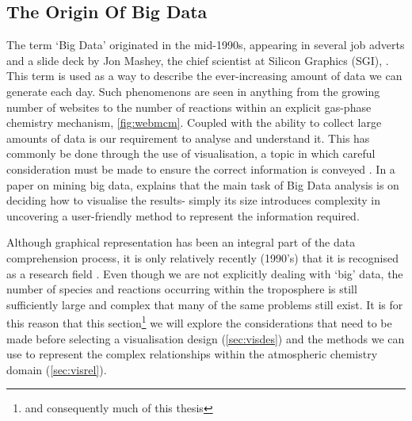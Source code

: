 %
%
%
%


\subsection{The Origin Of Big Data}
The term `Big Data' originated in the mid-1990s, appearing in several job adverts and a slide deck by Jon Mashey, the chief scientist at Silicon Graphics (SGI), \citep{slidedeck,bigdataorigin}. This term is used as a way to describe the ever-increasing amount of data we can generate each day. Such phenomenons are seen in anything from the growing number of websites to the number of reactions within an explicit gas-phase chemistry mechanism, \autoref{fig:webmcm}. Coupled with the ability to collect large amounts of data is our requirement to analyse and understand it. This has commonly be done through the use of visualisation, a topic in which careful consideration must be made to ensure the correct information is conveyed \citep{kirk}. In a paper on mining big data, \citep{bigdatamine} explains that the main task of Big Data analysis is on deciding how to visualise the results- simply its size introduces complexity in uncovering a user-friendly method to represent the information required.

Although graphical representation has been an integral part of the data comprehension process, it is only relatively recently (1990's) that it is recognised as a research field \citep{ch6}. Even though we are not explicitly dealing with `big' data, the number of species and reactions occurring within the troposphere is still sufficiently large and complex that many of the same problems still exist. It is for this reason that this section\footnote{and consequently much of this thesis} we will explore the considerations that need to be made before selecting a visualisation design (\autoref{sec:visdes}) and the methods we can use to represent the complex relationships within the atmospheric chemistry domain (\autoref{sec:visrel}).

